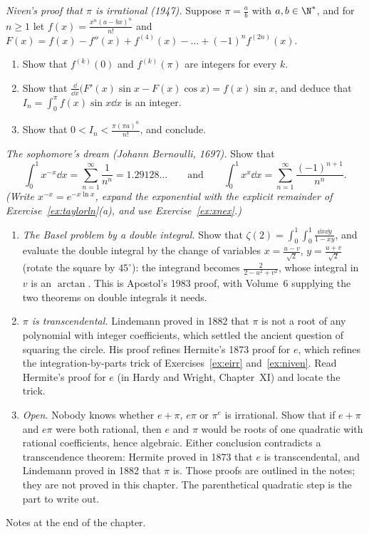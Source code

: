 \begin{exercise}[$\star\star\star$]\label{ex:niven}
\emph{Niven's proof that $\pi$ is irrational (1947).} Suppose $\pi=\frac ab$ with $a,b\in\N^*$, and for $n\ge1$ let $f(x)=\frac{x^n(a-bx)^n}{n!}$ and $F(x)=f(x)-f''(x)+f^{(4)}(x)-\dots+(-1)^nf^{(2n)}(x)$.
\begin{enumerate}[label=(\alph*)]
\item Show that $f^{(k)}(0)$ and $f^{(k)}(\pi)$ are integers for every $k$.
\item Show that $\frac{\dd}{\dd x}\bigl(F'(x)\sin x-F(x)\cos x\bigr)=f(x)\sin x$, and deduce that $I_n=\int_0^\pi f(x)\sin x\dd x$ is an integer.
\item Show that $0<I_n<\frac{\pi(\pi a)^n}{n!}$, and conclude.
\end{enumerate}
\end{exercise}

\begin{exercise}[$\star\star\star$]\label{ex:sophomore}
\emph{The sophomore's dream (Johann Bernoulli, 1697).} Show that
\[
\int_0^1x^{-x}\dd x=\sum_{n=1}^\infty\frac1{n^n}=1.29128\ldots\qquad\text{and}\qquad\int_0^1x^{x}\dd x=\sum_{n=1}^\infty\frac{(-1)^{n+1}}{n^n}.
\]
\emph{(Write $x^{-x}=e^{-x\ln x}$, expand the exponential with the explicit remainder of Exercise~\ref{ex:taylorln}(a), and use Exercise~\ref{ex:xnex}.)}
\end{exercise}

\begin{challenge}
\begin{enumerate}[label=(\arabic*)]
\item \emph{The Basel problem by a double integral.} Show that $\zeta(2)=\int_0^1\!\!\int_0^1\frac{\dd x\dd y}{1-xy}$, and evaluate the double integral by the change of variables $x=\frac{u-v}{\sqrt2}$, $y=\frac{u+v}{\sqrt2}$ (rotate the square by $45^\circ$): the integrand becomes $\frac2{2-u^2+v^2}$, whose integral in $v$ is an $\arctan$. This is Apostol's 1983 proof, with Volume~6 supplying the two theorems on double integrals it needs.
\item \emph{$\pi$ is transcendental.} Lindemann proved in 1882 that $\pi$ is not a root of any polynomial with integer coefficients, which settled the ancient question of squaring the circle. His proof refines Hermite's 1873 proof for $e$, which refines the integration-by-parts trick of Exercises~\ref{ex:eirr} and~\ref{ex:niven}. Read Hermite's proof for $e$ (in Hardy and Wright, Chapter~XI) and locate the trick.
\item \emph{Open.} Nobody knows whether $e+\pi$, $e\pi$ or $\pi^e$ is irrational. Show that if $e+\pi$ and $e\pi$ were both rational, then $e$ and $\pi$ would be roots of one quadratic with rational coefficients, hence algebraic. Either conclusion contradicts a transcendence theorem: Hermite proved in 1873 that $e$ is transcendental, and Lindemann proved in 1882 that $\pi$ is. Those proofs are outlined in the notes; they are not proved in this chapter. The parenthetical quadratic step is the part to write out.
\end{enumerate}
Notes at the end of the chapter.
\end{challenge}

